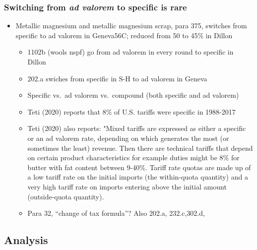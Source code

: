 \documentclass[
  12pt,
]{article}
\begin{document}
\hypertarget{switching-from-ad-valorem-to-specific-is-rare}{%
\subsubsection{\texorpdfstring{Switching from \emph{ad valorem} to specific is rare}{Switching from ad valorem to specific is rare}}\label{switching-from-ad-valorem-to-specific-is-rare}}

\begin{itemize}
\item
  Metallic magnesium and metallic magnesium scrap, para 375, switches from specific to ad valorem in Geneva56C; reduced from 50 to 45\% in Dillon

  \begin{itemize}
  \item
    1102b (wools nspf) go from ad valorem in every round to specific in Dillon
  \item
    202.a swiches from specific in S-H to ad valorem in Geneva
  \item
    Specific vs.~ad valorem vs.~compound (both specific and ad valorem)
  \item
    Teti (2020) reports that 8\% of U.S. tariffs were specific in 1988-2017
  \item
    Teti (2020) also reports: "Mixed tariffs are expressed as either a specific or an ad valorem rate, depending on which generates the most (or sometimes the least) revenue. Then there are technical tariffs that depend on certain product characteristics for example duties might be 8\% for butter with fat content between 9-40\%. Tariff rate quotas are made up of a low tariff rate on the initial imports (the within-quota quantity) and a very high tariff rate on imports entering above the initial amount (outside-quota quantity).
  \item
    Para 32, ``change of tax formula''? Also 202.a, 232.c,302.d,
  \end{itemize}
\end{itemize}

\hypertarget{analysis}{%
\subsection{Analysis}\label{analysis}}
\end{document}
